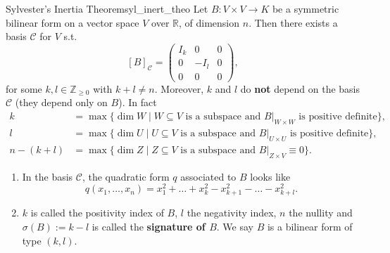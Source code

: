 \begin{theorem}{Sylvester's Inertia Theorem}{syl_inert_theo}
	Let $B:V \times V \to K$ be a symmetric bilinear form on a vector space $V$ over $\mathbb{R}$, of dimension $n$. Then there exists a basis $\mathcal{C}$ for $V$ s.t.
	\[
		[B]_{\mathcal{C}} = 
		\begin{pmatrix}
			I_k & 0 & 0\\
			0 & -I_l & 0\\
			0 & 0 & 0
		\end{pmatrix},
	\]
	for some $k,l \in \mathbb{Z}_{\geq 0}$ with $k + l \neq n$. Moreover, $k$ and $l$ do \textbf{not} depend on the basis $\mathcal{C}$ (they depend only on $B$). In fact
	\begin{align*}
		k &= \max\{\dim W \;|\; W \subseteq V \text{ is a subspace and } B|_{W \times W} \text{ is positive definite}\},\\
		l &= \max\{\dim U \;|\; U \subseteq V \text{ is a subspace and } B|_{U \times U} \text{ is positive definite}\}, \\
		n - (k + l) &= \max\{\dim Z \;|\; Z \subseteq V \text{ is a subspace and } B|_{Z \times V} \equiv 0\}.
	\end{align*}
\end{theorem}

\begin{remark}
	\begin{enumerate}
		\item In the basis $\mathcal{C}$, the quadratic form $q$ associated to $B$ looks like
		\[
			q(x_1, \hdots , x_n) = x_1^2 + \hdots + x_k^2 - x_{k+1}^2 - \hdots - x_{k+l}^2.
		\]
		\item $k$ is called the positivity index of $B$, $l$ the negativity index, $n$ the nullity and $\sigma(B) := k - l$ is called the \textbf{signature of $B$}. We say $B$ is a bilinear form of type $(k,l)$.
	\end{enumerate}
\end{remark}

